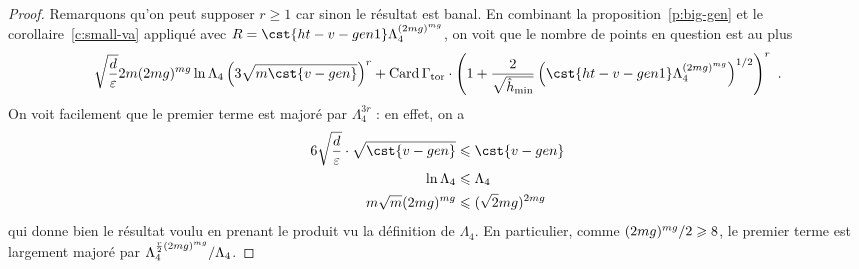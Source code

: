 \begin{proof}
  Remarquons qu'on peut supposer \( r \ge 1 \) car sinon le résultat est
  banal.  En combinant la proposition~\ref{p:big-gen} et le
  corollaire~\ref{c:small-va} appliqué avec \( R = \cst{ht-v-gen1}
    \Lambda_4^{(2\puiss\genre)^{\puiss\genre}} \), on voit que le nombre de
  points en question est au plus
  \begin{equation}
    \sqrt{\frac d \expapx}
    2 \puiss
    (2\puiss\genre)^{\puiss\genre}
    \ln \Lambda_4
    \left( 3 \sqrt{ \puiss \cst{v-gen} } \right)^r
    +
    \card \Gamma_\torsion
    \cdot
    \left( 1 + \frac2{\sqrt{\hmin}}
      \left(
        \cst{ht-v-gen1} \Lambda_4^{(2\puiss\genre)^{\puiss\genre}}
      \right)^{1/2}
    \right)^r
    \pmm.
  \end{equation}
  On voit facilement que le premier terme est majoré par \( \Lambda_4^{3r} \)
  : en effet, on a
  \begin{align}
    6 \sqrt{\frac d \expapx}
    \cdot \sqrt{ \cst{v-gen} }
    & \le
    \cst{v-gen}
    \\
    \ln \Lambda_4
    & \le
    \Lambda_4
    \\
    \puiss \sqrt\puiss
    (2\puiss\genre)^{\puiss\genre}
    & \le
    (\sqrt2 \puiss \genre)^{2\puiss\genre}
  \end{align}
  qui donne bien le résultat voulu en prenant le produit vu la définition de
  \( \Lambda_4 \). En particulier, comme \( (2mg)^{mg} /
    2 \geqslant 8 \), le premier terme est largement majoré par \( \Lambda_4^{ \frac
      r2 (2mg)^{mg} } / \Lambda_4 \).


\end{proof}
